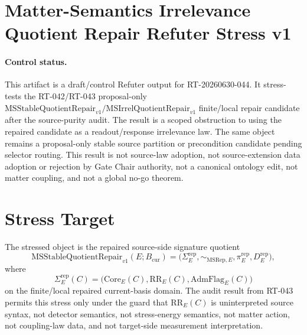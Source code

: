\section*{Matter-Semantics Irrelevance Quotient Repair Refuter Stress v1}

\paragraph{Control status.}
This artifact is a draft/control Refuter output for RT-20260630-044. It
stress-tests the RT-042/RT-043 proposal-only
\(\mathrm{MSStableQuotientRepair}_{v1}/
\mathrm{MSIrrelQuotientRepair}_{v1}\) finite/local repair candidate after the
source-purity audit. The result is a scoped obstruction to using the repaired
candidate as a readout/response irrelevance law. The same object remains a
proposal-only stable source partition or precondition candidate pending
selector routing. This result is not source-law adoption, not
source-extension data adoption or rejection by Gate Chair authority, not a
canonical ontology edit, not matter coupling, and not a global no-go theorem.

\newcommand{\Bcur}{B_{\mathrm{cur}}}
\newcommand{\MSAdm}{\mathrm{MSAdm}_{v1}}
\newcommand{\MSStableRepair}{\mathrm{MSStableQuotientRepair}_{v1}}
\newcommand{\MSIrrelRepair}{\mathrm{MSIrrelQuotientRepair}_{v1}}
\newcommand{\MSSig}{\Sigma^{\mathrm{rep}}_E}
\newcommand{\MSRepEq}{\sim_{\mathrm{MSRep},E}}
\newcommand{\MSRepProj}{\pi^{\mathrm{rep}}_E}
\newcommand{\MSRepDisc}{D^{\mathrm{rep}}_E}
\newcommand{\Ob}{\mathrm{MSRepairObstruction}_{v1}}

\newtheorem{definition}{Definition}
\newtheorem{proposition}{Proposition}

\section{Stress Target}

The stressed object is the repaired source-side signature quotient
\[
  \MSStableRepair(E;\Bcur)=
  \bigl(\MSSig,\MSRepEq,\MSRepProj,\MSRepDisc\bigr),
\]
where
\[
  \MSSig(C)=
  \bigl(\mathrm{Core}_E(C),\mathrm{RR}_E(C),
  \mathrm{AdmFlag}_E(C)\bigr)
\]
on the finite/local repaired current-basis domain. The audit result from
RT-043 permits this stress only under the guard that
\(\mathrm{RR}_E(C)\) is uninterpreted source syntax, not detector semantics,
not stress-energy semantics, not matter action, not coupling-law data, and
not target-side measurement interpretation.

